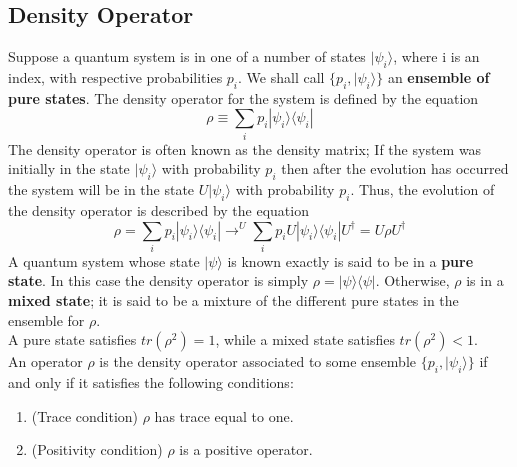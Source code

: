 \documentclass[12pt]{report}
\begin{document}
\subsection{Density Operator}
Suppose a quantum system is in one of a number of states $|\psi_i\rangle$, where i is an index, with respective probabilities $p_i$. We shall call $\{p_i,|\psi_i\rangle\}$ an \textbf{ensemble of pure states}. The density operator for the system is defined by the equation 
\begin{equation}
\rho \equiv \sum_i p_i|\psi_i\rangle\langle\psi_i|
\end{equation}
The density operator is often known as the density matrix; If the system was initially in the state $|\psi_i\rangle$ with probability $p_i$ then after the evolution has occurred the system will be in the state $U|\psi_i\rangle$ with probability $p_i$. Thus, the evolution of the density operator is described by the equation
\begin{equation}
\rho = \sum_i p_i|\psi_i\rangle\langle\psi_i| \to^U \sum_i p_iU|\psi_i\rangle\langle\psi_i|U^\dagger = U\rho U^\dagger
\end{equation}
A quantum system whose state $|\psi\rangle$ is known exactly is said to be in a \textbf{pure state}. In this case the density operator is simply $\rho = |\psi\rangle\langle\psi|$. Otherwise, $\rho$ is in a \textbf{mixed state}; it is said to be a mixture of the different pure states in the ensemble for $\rho$.\\
A pure state satisfies $tr(\rho^2) = 1$, while a mixed state satisfies $tr(\rho^2) < 1$.\\
An operator $\rho$ is the density operator associated to some ensemble $\{p_i,|\psi_i\rangle\}$ if and only if it satisfies the following conditions:
\begin{enumerate}
\item (Trace condition) $\rho$ has trace equal to one.
\item (Positivity condition) $\rho$ is a positive operator.\\ 
\end{enumerate}
\end{document}
